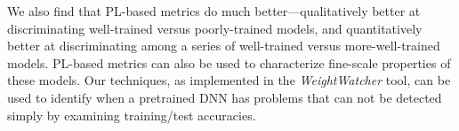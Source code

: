 We also find that PL-based metrics do much better---qualitatively better at discriminating well-trained versus poorly-trained models, and quantitatively better at discriminating among a series of well-trained versus more-well-trained models.
PL-based metrics can also be used to characterize fine-scale properties of these models.
Our techniques, as implemented in the \emph{WeightWatcher} tool, can be used to identify when a pretrained DNN has problems that can not be detected simply by examining training/test accuracies.


